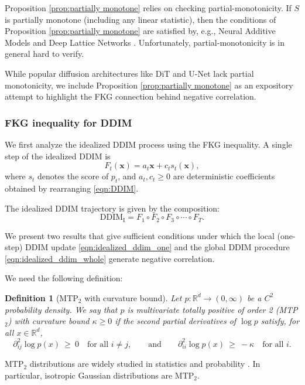 \documentclass[12pt]{article}
\newcommand{\x}{\mathbf{x}}
\newcommand{\0}{\mathbf{0}}
\newcommand{\DDIMIdeal}{\mathrm{DDIM}_{\mathrm{I}}}
\newtheorem{definition}{Definition}
\begin{document}
Proposition \ref{prop:partially monotone} relies on checking partial-monotonicity. If $S$ is partially monotone (including any linear statistic), then the conditions of Proposition \ref{prop:partially monotone} are satisfied by, e.g., Neural Additive Models \citep{agarwal2021neural} and Deep Lattice Networks \citep{you2017deep}.
Unfortunately, partial-monotonicity is in general hard to verify.

While popular diffusion architectures like DiT and U-Net lack partial monotonicity, we include Proposition \ref{prop:partially monotone} as an expository attempt to highlight the FKG connection behind negative correlation.


\subsubsection{FKG inequality for  DDIM}\label{subsubsec:idealized fkg}

We first analyze the idealized DDIM process using the FKG inequality. A single step of the idealized DDIM is
\begin{equation}\label{eqn:idealized_ddim_one}
F_t(\x) = a_t \x + c_t s_{t}(\x),
\end{equation}
where $s_t$ denotes the score of $p_t$, and $a_t, c_t \geq 0$ are deterministic coefficients obtained by rearranging \eqref{eqn:DDIM}.

The idealized DDIM trajectory is given by the composition:
\begin{equation}\label{eqn:idealized_ddim_whole}
   \DDIMIdeal =  F_1 \circ F_2 \circ F_3 \circ \cdots \circ F_T.
\end{equation}

We present two results that give sufficient conditions under which the local (one-step) DDIM update \eqref{eqn:idealized_ddim_one} and the global DDIM procedure \eqref{eqn:idealized_ddim_whole} generate negative correlation.

We need the following definition:
\begin{definition}[MTP$_2$ with curvature bound]\label{def:MTP2}
Let $p:\mathbb{R}^d\to(0,\infty)$ be a $C^2$ probability density. We say that $p$ is multivariate totally positive of order 2 \emph{(MTP$_2$) with curvature bound $\kappa\ge 0$} if the second partial derivatives of $\log p$ satisfy, for all $x\in\mathbb{R}^d$,
\[
\partial_{ij}^2 \log p(x)\ \ge\ 0\quad\text{for all }i\neq j,
\qquad\text{and}\qquad
\partial_{ii}^2 \log p(x)\ \ge\ -\kappa\quad\text{for all }i.
\]
\end{definition}
MTP$_2$ distributions are widely studied in statistics and probability \cite{karlin1980classes}. In particular, isotropic Gaussian distributions are MTP$_2$.
\end{document}
